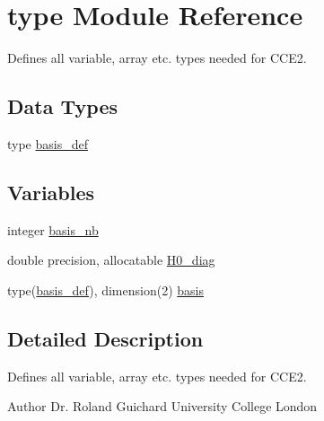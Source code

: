 \hypertarget{namespacetype}{
\section{type Module Reference}
\label{namespacetype}
}


Defines all variable, array etc. types needed for CCE2.  
\subsection*{Data Types}
\begin{DoxyCompactItemize}
\item 
type \hyperlink{typetype_1_1basis__def}{basis\_\-def}
\end{DoxyCompactItemize}
\subsection*{Variables}
\begin{DoxyCompactItemize}
\item 
integer \hyperlink{namespacetype_a8147b0e65a57c1e13f37406eb567974c}{basis\_\-nb}
\item 
double precision, allocatable \hyperlink{namespacetype_a5059bb126df0403fee858f273ff2393d}{H0\_\-diag}
\item 
type(\hyperlink{typetype_1_1basis__def}{basis\_\-def}), dimension(2) \hyperlink{namespacetype_a398941ef8f9eeb6255ff44e9ba5d23b1}{basis}
\end{DoxyCompactItemize}


\subsection{Detailed Description}
Defines all variable, array etc. types needed for CCE2. \begin{DoxyAuthor}{Author}
Dr. Roland Guichard University College London 
\end{DoxyAuthor}


